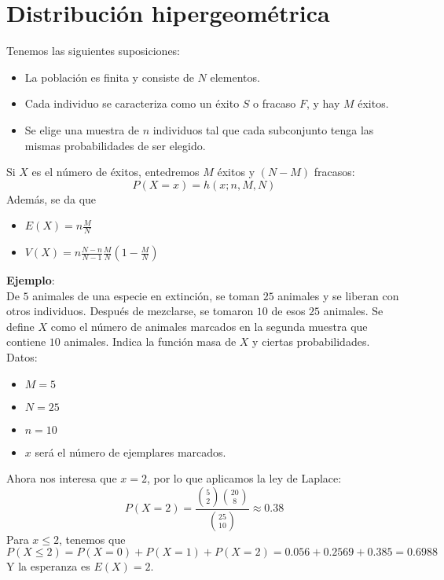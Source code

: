 \documentclass{./Probabilidad.tex}
\begin{document}
\section{Distribución hipergeométrica}
Tenemos las siguientes suposiciones:
\begin{itemize}
	\item La población es finita y consiste de $N$ elementos.
	\item Cada individuo se caracteriza como un éxito $S$ o fracaso $F$, y hay $M$ éxitos.
	\item Se elige una muestra de $n$ individuos tal que cada subconjunto tenga las mismas probabilidades de ser elegido. 
\end{itemize}
Si $X$ es el número de éxitos, entedremos $M$ éxitos y $(N-M)$ fracasos:
\[
	P(X=x)=h(x;n,M,N)
\]
Además, se da que
\begin{itemize}
	\item $E(X)=n \frac{M}{N}$
	\item $V(X)=n \frac{N-n}{N-1} \frac{M}{N} (1 - \frac{M}{N})$ 
\end{itemize}
\textbf{Ejemplo}:\\
De $5$ animales de una especie en extinción, se toman $25$ animales y se liberan con otros individuos. Después de mezclarse, se tomaron $10$ de esos $25$ animales. Se define $X$ como el número de animales marcados en la segunda muestra que contiene $10$ animales. Indica la función masa de $X$ y ciertas probabilidades.\\
Datos:
\begin{itemize}
	\item $M=5$
	\item $N=25$
	\item $n=10$
	\item $x$ será el número de ejemplares marcados. 
\end{itemize}
Ahora nos interesa que $x=2$, por lo que aplicamos la ley de Laplace:
\[
	P(X=2)= \frac{\binom{5}{2}\binom{20}{8}}{\binom{25}{10}}\approx 0.38
\]
Para $x\leq 2$, tenemos que
\[
	P(X\leq 2) = P(X=0) + P(X=1)+P(X=2)=0.056+0.2569+0.385=0.6988
\]
Y la esperanza es $E(X)=2$.
\end{document}
